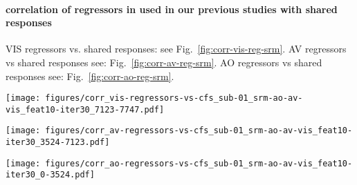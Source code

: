 

\paragraph{correlation of regressors in used in our previous studies with shared
responses}




%
VIS regressors vs. shared responses: see Fig.~\ref{fig:corr-vis-reg-srm}.
%
AV regressors vs shared responses see: Fig.~\ref{fig:corr-av-reg-srm}.
%
AO regressors vs shared responses see: Fig.~\ref{fig:corr-ao-reg-srm}.



\begin{figure*}[tbp]
\centering
\texttt{[image: figures/corr\_vis-regressors-vs-cfs\_sub-01\_srm-ao-av-vis\_feat10-iter30\_7123-7747.pdf]}
    \caption{
    \textbf{Correlations of regressors of visual localizer and shared responses.
    }
    Lore ipsum.
}
    \label{fig:corr-vis-reg-srm}
\end{figure*}



\begin{figure*}[tbp]
\centering
    \texttt{[image: figures/corr\_av-regressors-vs-cfs\_sub-01\_srm-ao-av-vis\_feat10-iter30\_3524-7123.pdf]}
    \caption{
    \textbf{Correlations of regressors of movie and shared responses.}
    Lore ipsum.
    }
    \label{fig:corr-av-reg-srm}
\end{figure*}



\begin{figure*}[tbp]
\centering
    \texttt{[image: figures/corr\_ao-regressors-vs-cfs\_sub-01\_srm-ao-av-vis\_feat10-iter30\_0-3524.pdf]}
    \caption{
    \textbf{Correlations of regressors of audio-description and shared
    responses.}
    Pearson correlation coefficients of regressors used in the analysis of
    audio-description to model shared responses (sh. res.) correlating with
    nouns spoken by the
    narrator and features of the \ac{srm} (i.e. shared responses).
    \texttt{geo\&groom} \texttt{geo\&groom\&furn} are combination of regressors
    (as used on the positive side of contrasts).
    The time series of the \ac{srm} were sliced to match the TRs of the
    audio-description.
    }
    \label{fig:corr-ao-reg-srm}
\end{figure*}



